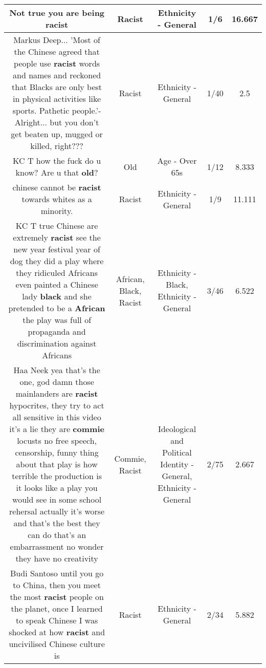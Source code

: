\documentclass[11pt]{article}
\newlength\mylength
\begin{document}
\begin{center}
\begin{longtable}{|C{.65\mylength}|C{.30\mylength}|C{.12\mylength}|C{.12\mylength}|C{.12\mylength}|}
  \small Not true you are being racist\normalsize   & Racist & Ethnicity - General & 1/6 & 16.667 \\  \hline
  \small Markus Deep... 'Most of the Chinese agreed that people use \textbf{racist} words and names and reckoned that Blacks are only best in physical activities like sports. Pathetic people.'- Alright... but you don't get beaten up, mugged or killed, right???\normalsize   & Racist & Ethnicity - General & 1/40 & 2.5 \\  \hline
  \small KC T how the fuck do u know? Are u that \textbf{old}?\normalsize   & Old & Age - Over 65s & 1/12 & 8.333 \\  \hline
  \small chinese cannot be \textbf{racist} towards whites as a minority.\normalsize   & Racist & Ethnicity - General & 1/9 & 11.111 \\  \hline
  \small KC T true Chinese are extremely \textbf{racist} see the new year festival year of dog they did a play where they ridiculed Africans even painted a Chinese lady \textbf{black} and she pretended to be a \textbf{African} the play was full of propaganda and discrimination against Africans\normalsize   & African, Black, Racist & Ethnicity - Black, Ethnicity - General & 3/46 & 6.522 \\  \hline
  \small Haa Neek yea that's the one, god damn those mainlanders are \textbf{racist} hypocrites, they try to act all sensitive in this video it's a lie they are \textbf{commie} locusts no free speech, censorship, funny thing about that play is how terrible the production is it looks like a play you would see in some school rehersal actually it's worse and that's the best they can do that's an embarrassment no wonder they have no creativity\normalsize   & Commie, Racist &  Ideological and Political Identity - General, Ethnicity - General & 2/75 & 2.667 \\  \hline
  \small Budi Santoso until you go to China, then you meet the most \textbf{racist} people on the planet, once I learned to speak Chinese I was shocked at how \textbf{racist} and uncivilised Chinese culture is\normalsize   & Racist & Ethnicity - General & 2/34 & 5.882 \\  \hline

\end{longtable}
\end{center}
\end{document}
